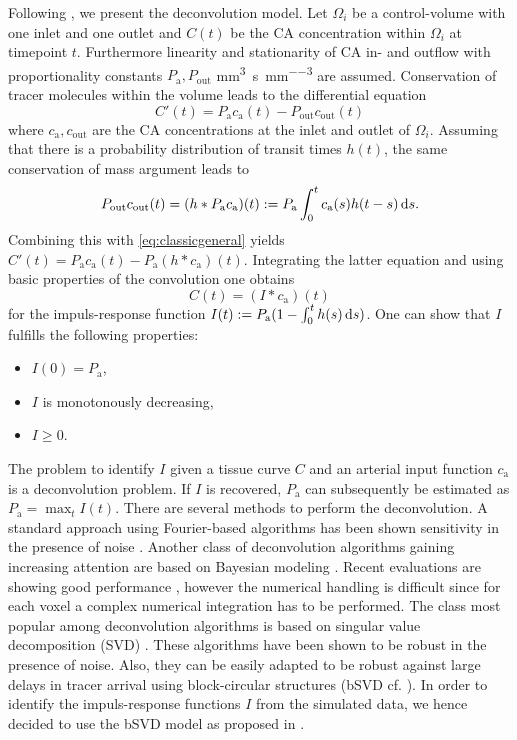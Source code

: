 \documentclass[paper=a4, fontsize=12pt,parskip=half, draft, headings=small]{scrartcl}
\newcommand{\ca}{c_\mathrm{a}}
\newcommand{\cout}{c_{\mathrm{out}}}
\newcommand{\Pa}{P_{\mathrm{a}}}
\newcommand{\Pout}{P_{\mathrm{out}}}
\newcommand{\siP}{\cubic\milli\meter\per\second\per\cubic\milli\meter}
\begin{document}
	Following \cite{sourbron13}, we present the deconvolution model.
	Let $\Omega_i$ be a control-volume with one inlet and one outlet and $C(t)$ be the CA concentration within $\Omega_i$ at timepoint $t$.
	Furthermore linearity and stationarity of CA in- and outflow with proportionality constants $\Pa,\Pout$ \si{\siP} are assumed.
	Conservation of tracer molecules within the volume leads to the differential equation 
	\begin{equation}
		C'(t) = \Pa\ca(t) - \Pout\cout(t)
		\label{eq:classicgeneral}
	\end{equation}
	where $\ca,\cout$ are the CA concentrations at the inlet and outlet of $\Omega_i$. 	
	Assuming that there is a probability distribution of transit times $h(t)$, the same conservation of mass argument leads to
	\[
		\Pout\cout(t) = (h*\Pa\ca)(t) := \Pa\int_0^t \ca(s) h(t-s) \diffint s.
	\]
	Combining this with \eqref{eq:classicgeneral} yields $C'(t) = \Pa\ca(t)-\Pa (h*\ca)(t)$.
	Integrating the latter equation and using basic properties of the convolution one obtains
	\[
		C(t) = (I*\ca)(t)
	\]
	for the impuls-response function $I(t) := \Pa(1-\int_0^t h(s) \diffint s)$.
	One can show that $I$ fulfills the following properties:
	\begin{itemize}
		\item $I(0) = \Pa$,
		\item $I$ is monotonously decreasing,
		\item $I\ge 0$.		
	\end{itemize}
	The problem to identify $I$ given a tissue curve $C$ and an arterial input function $\ca$ is a deconvolution problem.
	If $I$ is recovered, $\Pa$ can subsequently be estimated as $\Pa = \max_{t} I(t)$.
	There are several methods to perform the deconvolution.
	A standard approach using Fourier-based algorithms has been shown sensitivity in the presence of noise \cite{wirestam00,ostergaard96}.
	Another class of deconvolution algorithms gaining increasing attention are based on Bayesian modeling \cite{boutelier12,mouridsen06}.
	Recent evaluations are showing good performance \cite{sasaki13}, however the numerical handling is difficult since for each voxel a complex numerical integration has to be performed.
	The class most popular among deconvolution algorithms is based on singular value decomposition (SVD) \cite{ostergaard96}.
	These algorithms have been shown to be robust in the presence of noise.
	Also, they can be easily adapted to be robust against large delays in tracer arrival using block-circular structures (bSVD cf. \cite{wu03}).
	In order to identify the impuls-response functions $I$ from the simulated data, we hence decided to use the bSVD model as proposed in \cite{wu03}.
	
\end{document}
